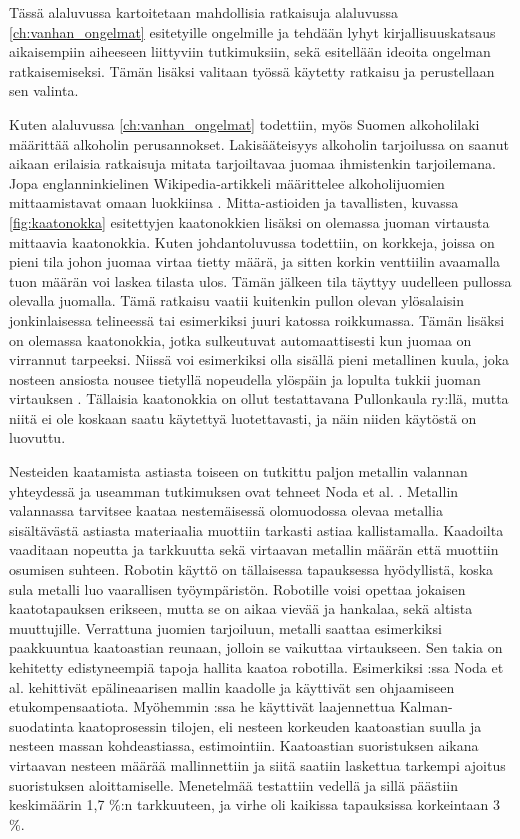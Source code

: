 Tässä alaluvussa kartoitetaan mahdollisia ratkaisuja alaluvussa \ref{ch:vanhan_ongelmat} esitetyille ongelmille ja tehdään lyhyt kirjallisuuskatsaus aikaisempiin aiheeseen liittyviin tutkimuksiin, sekä esitellään ideoita ongelman ratkaisemiseksi. Tämän lisäksi valitaan työssä käytetty ratkaisu ja perustellaan sen valinta.

Kuten alaluvussa \ref{ch:vanhan_ongelmat} todettiin, myös Suomen alkoholilaki määrittää alkoholin perusannokset. Lakisääteisyys alkoholin tarjoilussa on saanut aikaan erilaisia ratkaisuja mitata tarjoiltavaa juomaa ihmistenkin tarjoilemana. Jopa englanninkielinen Wikipedia-artikkeli määrittelee alkoholijuomien mittaamistavat omaan luokkiinsa \cite{Wikipedia}. Mitta-astioiden ja tavallisten, kuvassa \ref{fig:kaatonokka} esitettyjen kaatonokkien lisäksi on olemassa juoman virtausta mittaavia kaatonokkia. Kuten johdantoluvussa todettiin, on korkkeja, joissa on pieni tila johon juomaa virtaa tietty määrä, ja sitten korkin venttiilin avaamalla tuon määrän voi laskea tilasta ulos. Tämän jälkeen tila täyttyy uudelleen pullossa olevalla juomalla. Tämä ratkaisu vaatii kuitenkin pullon olevan ylösalaisin jonkinlaisessa telineessä tai esimerkiksi juuri katossa roikkumassa. Tämän lisäksi on olemassa kaatonokkia, jotka sulkeutuvat automaattisesti kun juomaa on virrannut tarpeeksi. Niissä voi esimerkiksi olla sisällä pieni metallinen kuula, joka nosteen ansiosta nousee tietyllä nopeudella ylöspäin ja lopulta tukkii juoman virtauksen \cite{Barproducts}. Tällaisia kaatonokkia on ollut testattavana Pullonkaula ry:llä, mutta niitä ei ole koskaan saatu käytettyä luotettavasti, ja näin niiden käytöstä on luovuttu.

Nesteiden kaatamista astiasta toiseen on tutkittu paljon metallin valannan yhteydessä ja useamman tutkimuksen ovat tehneet Noda et al. \cite{Noda2007}\cite{Noda2008}\cite{Noda2009}. Metallin valannassa tarvitsee kaataa nestemäisessä olomuodossa olevaa metallia sisältävästä astiasta materiaalia muottiin tarkasti astiaa kallistamalla. Kaadoilta vaaditaan nopeutta ja tarkkuutta sekä virtaavan metallin määrän että muottiin osumisen suhteen. Robotin käyttö on tällaisessa tapauksessa hyödyllistä, koska sula metalli luo vaarallisen työympäristön. Robotille voisi opettaa jokaisen kaatotapauksen erikseen, mutta se on aikaa vievää ja hankalaa, sekä altista muuttujille. Verrattuna juomien tarjoiluun, metalli saattaa esimerkiksi paakkuuntua kaatoastian reunaan, jolloin se vaikuttaa virtaukseen. Sen takia on kehitetty edistyneempiä tapoja hallita kaatoa robotilla. Esimerkiksi \cite{Noda2007}:ssa Noda et al. kehittivät epälineaarisen mallin kaadolle ja käyttivät sen ohjaamiseen etukompensaatiota. Myöhemmin \cite{Noda2009}:ssa he käyttivät laajennettua Kalman-suodatinta kaatoprosessin tilojen, eli nesteen korkeuden kaatoastian suulla ja nesteen massan kohdeastiassa, estimointiin. Kaatoastian suoristuksen aikana virtaavan nesteen määrää mallinnettiin ja siitä saatiin laskettua tarkempi ajoitus suoristuksen aloittamiselle. Menetelmää testattiin vedellä ja sillä päästiin keskimäärin 1,7 \%:n tarkkuuteen, ja virhe oli kaikissa tapauksissa korkeintaan 3 \%.

